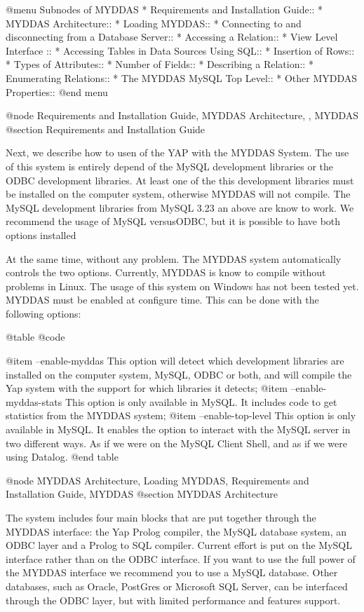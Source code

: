 {{{{{{{{{@menu
Subnodes of MYDDAS
* Requirements and Installation Guide:: 
* MYDDAS Architecture:: 
* Loading MYDDAS:: 
* Connecting to and disconnecting from a Database Server:: 
* Accessing a Relation:: 
* View Level Interface :: 
* Accessing Tables in Data Sources Using SQL:: 
* Insertion of Rows:: 
* Types of Attributes:: 
* Number of Fields:: 
* Describing a Relation:: 
* Enumerating Relations:: 
* The MYDDAS MySQL Top Level:: 
* Other MYDDAS Properties:: 
@end menu

@node Requirements and Installation Guide, MYDDAS Architecture, , MYDDAS
@section Requirements and Installation Guide

Next, we describe how to usen of the YAP with the MYDDAS System.  The
use of this system is entirely depend of the MySQL development libraries
or the ODBC development libraries. At least one of the this development
libraries must be installed on the computer system, otherwise MYDDAS
will not compile. The MySQL development libraries from MySQL 3.23 an
above are know to work. We recommend the usage of MySQL versusODBC,
but it is possible to have both options installed

At the same time, without any problem. The MYDDAS system automatically
controls the two options. Currently, MYDDAS is know to compile without
problems in Linux. The usage of this system on Windows has not been
tested yet.  MYDDAS must be enabled at configure time. This can be done
with the following options: 

@table @code

@item --enable-myddas
 This option will detect which development libraries are installed on the computer system, MySQL, ODBC or both, and will compile the Yap system with the support for which libraries it detects;
@item  --enable-myddas-stats
This option is only available in MySQL. It includes code to get
statistics from the MYDDAS system;
@item  --enable-top-level
This option is only available in MySQL.  It enables the option to interact with the MySQL server in
two different ways. As if we were on the MySQL Client Shell, and as if
we were using Datalog. 
@end table

@node MYDDAS Architecture, Loading MYDDAS, Requirements and Installation Guide, MYDDAS
@section MYDDAS Architecture

The system includes four main blocks that are put together through the
MYDDAS interface: the Yap Prolog compiler, the MySQL database system, an
ODBC layer and a Prolog to SQL compiler. Current effort is put on the
MySQL interface rather than on the ODBC interface. If you want to use
the full power of the MYDDAS interface we recommend you to use a MySQL
database. Other databases, such as Oracle, PostGres or Microsoft SQL
Server, can be interfaced through the ODBC layer, but with limited
performance and features support.  

}}}}}}}}}
